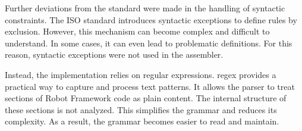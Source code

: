 Further deviations from the standard were made in the handling of syntactic constraints. The ISO standard introduces syntactic exceptions to define rules by exclusion. However, this mechanism can become complex and difficult to understand. In some cases, it can even lead to problematic definitions. For this reason, syntactic exceptions were not used in the assembler.

Instead, the implementation relies on regular expressions. \Gls{regex} provides a practical way to capture and process text patterns. It allows the parser to treat sections of Robot Framework code as plain content. The internal structure of these sections is not analyzed. This simplifies the grammar and reduces its complexity. As a result, the grammar becomes easier to read and maintain.